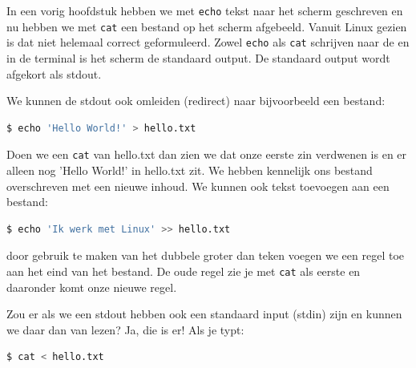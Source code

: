 In een vorig hoofdstuk hebben we met \texttt{echo} tekst naar het scherm geschreven en nu hebben we met \texttt{cat} een bestand op het scherm afgebeeld. Vanuit Linux gezien is dat niet helemaal correct geformuleerd. Zowel \texttt{echo} als \texttt{cat} schrijven naar de  en in de terminal is het scherm de standaard output. De standaard output wordt afgekort als stdout.

We kunnen de stdout ook omleiden (redirect) naar bijvoorbeeld een bestand:

\begin{lstlisting}[language=bash]
$ echo 'Hello World!' > hello.txt
\end{lstlisting}

Doen we een \texttt{cat} van hello.txt dan zien we dat onze eerste zin verdwenen is en er alleen nog 'Hello World!' in hello.txt zit. We hebben kennelijk ons bestand overschreven met een nieuwe inhoud. We kunnen ook tekst toevoegen aan een bestand:

\begin{lstlisting}[language=bash]
$ echo 'Ik werk met Linux' >> hello.txt
\end{lstlisting}

door gebruik te maken van het dubbele groter dan teken voegen we een regel toe aan het eind van het bestand. De oude regel zie je met \texttt{cat} als eerste en daaronder komt onze nieuwe regel.

Zou er als we een stdout hebben ook een standaard input (stdin) zijn en kunnen we daar dan van lezen? Ja, die is er! Als je
typt:

\begin{lstlisting}[language=bash]
$ cat < hello.txt
\end{lstlisting}

